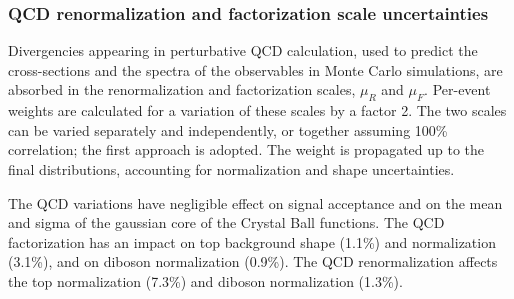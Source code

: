 \subsubsection{QCD renormalization and factorization scale uncertainties}

Divergencies appearing in perturbative QCD calculation, used to predict the cross-sections and the spectra of the observables in Monte Carlo simulations, are absorbed in the renormalization and factorization scales, $\mu_R$ and $\mu_F$. Per-event weights are calculated for a variation of these scales by a factor 2. The two scales can be varied separately and independently, or together assuming 100\% correlation; the first approach is adopted. The weight is propagated up to the final distributions, accounting for normalization and shape uncertainties.

\noindent The QCD variations have negligible effect on signal acceptance and on the mean and sigma of the gaussian core of the Crystal Ball functions. The QCD factorization has an impact on top background shape (1.1\%) and normalization (3.1\%), and on diboson normalization (0.9\%). The QCD renormalization affects the top normalization (7.3\%) and diboson normalization (1.3\%).


